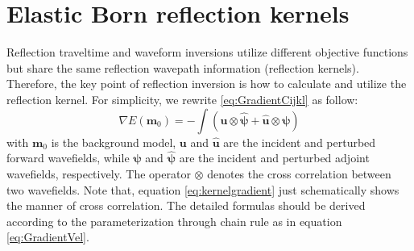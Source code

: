 \documentclass[extra,mreferee]{gji}
\newcommand{\bsy}[1]{\boldsymbol{{}#1}}
\begin{document}
\section{Elastic Born reflection kernels}
Reflection traveltime and waveform inversions utilize different objective functions
but share the same reflection wavepath information (reflection kernels). 
Therefore, the key point of reflection inversion is how to calculate and utilize the reflection kernel. 
For simplicity, we rewrite \eqref{eq:GradientCijkl} as follow:
\begin{equation}
    \nabla E(
    \mathbf{m}_0)=-\int(
    \mathbf{u}\otimes\bsy{\hat\psi}
    +
	\mathbf{\hat{u}}\otimes{\bsy{\psi}})
    \label{eq:kernelgradient} 
\end{equation} 
with $\mathbf{m}_0$ is the background model, $\mathbf{u}$ and $\mathbf{\hat{u}}$ are the incident
and perturbed forward wavefields,
 while $\bsy{\psi}$ and $\bsy{\hat\psi}$ are the incident and perturbed adjoint wavefields,
 respectively.
The operator $\otimes$ denotes the cross correlation between two wavefields. 
Note that, equation \eqref{eq:kernelgradient} just schematically shows the manner of cross correlation. 
The detailed formulas should be derived according to the parameterization through
chain rule as in equation \eqref{eq:GradientVel}.
\end{document}
